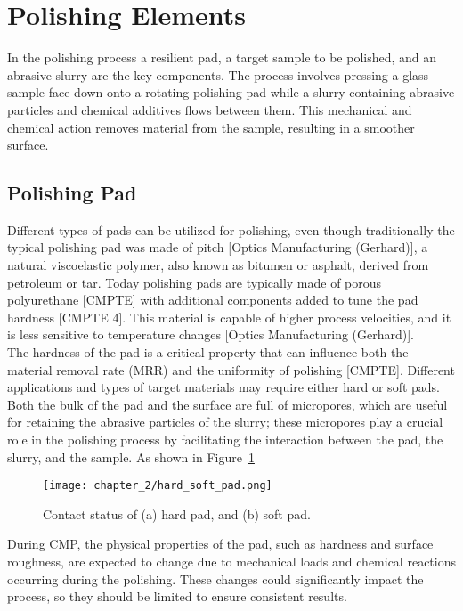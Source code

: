 \section{Polishing Elements}
\label{sec:polishing_elements}
In the polishing process a resilient pad, a target sample to be polished, and an abrasive slurry are the key components. The process involves pressing a glass sample face down onto a rotating polishing pad while a slurry containing abrasive particles and chemical additives flows between them. This mechanical and chemical action removes material from the sample, resulting in a smoother surface.
\subsection{Polishing Pad}
Different types of pads can be utilized for polishing, even though traditionally the typical polishing pad was made of pitch [Optics Manufacturing (Gerhard)], a natural viscoelastic polymer, also known as bitumen or asphalt, derived from petroleum or tar. Today polishing pads are typically made of porous polyurethane [CMPTE] with additional components added to tune the pad hardness [CMPTE 4]. This material is capable of higher process velocities, and it is less sensitive to temperature changes [Optics Manufacturing (Gerhard)]. 
\\
The hardness of the pad is a critical property that can influence both the material removal rate (MRR) and the uniformity of polishing [CMPTE]. Different applications and types of target materials may require either hard or soft pads.
\\
Both the bulk of the pad and the surface are full of micropores, which are useful for retaining the abrasive particles of the slurry; these micropores play a crucial role in the polishing process by facilitating the interaction between the pad, the slurry, and the sample. As shown in Figure~\ref{fig:hard_soft_pad}
\begin{figure}[H]
    \centering
    \texttt{[image: chapter\_2/hard\_soft\_pad.png]}
    \caption[Comparison between a hard pad and a soft pad.]{ Contact status of (a) hard pad, and (b) soft pad. }
    \label{fig:hard_soft_pad}
\end{figure}
During CMP, the physical properties of the pad, such as hardness and surface roughness, are expected to change due to mechanical loads and chemical reactions occurring during the polishing. These changes could significantly impact the process, so they should be limited to ensure consistent results.

